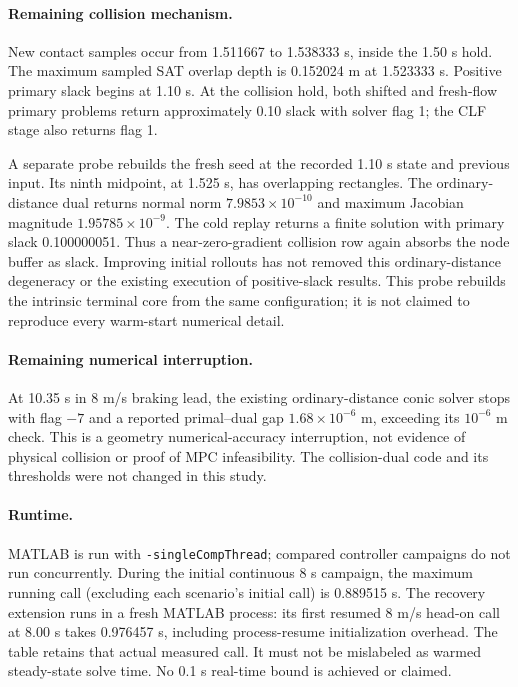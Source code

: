 \documentclass[11pt]{article}
\begin{document}
\paragraph{Remaining collision mechanism.} New contact samples occur from
1.511667 to 1.538333 s, inside the 1.50 s hold. The maximum sampled SAT overlap
depth is 0.152024 m at 1.523333 s. Positive primary slack begins at 1.10 s.
At the collision hold, both shifted and fresh-flow primary problems return
approximately 0.10 slack with solver flag 1; the CLF stage also returns flag 1.

A separate probe rebuilds the fresh seed at the recorded 1.10 s state and
previous input. Its ninth midpoint, at 1.525 s, has overlapping rectangles.
The ordinary-distance dual returns normal norm $7.9853\times10^{-10}$ and
maximum Jacobian magnitude $1.95785\times10^{-9}$. The cold replay returns a
finite solution with primary slack 0.100000051. Thus a near-zero-gradient
collision row again absorbs the node buffer as slack. Improving initial
rollouts has not removed this ordinary-distance degeneracy or the existing
execution of positive-slack results. This probe rebuilds the intrinsic
terminal core from the same configuration; it is not claimed to reproduce
every warm-start numerical detail.

\paragraph{Remaining numerical interruption.} At 10.35 s in 8 m/s braking
lead, the existing ordinary-distance conic solver stops with flag $-7$ and a
reported primal--dual gap $1.68\times10^{-6}$ m, exceeding its $10^{-6}$ m
check. This is a geometry numerical-accuracy interruption, not evidence of
physical collision or proof of MPC infeasibility. The collision-dual code and
its thresholds were not changed in this study.

\paragraph{Runtime.} MATLAB is run with \texttt{-singleCompThread}; compared
controller campaigns do not run concurrently. During the initial continuous
8 s campaign, the maximum running call (excluding each scenario's initial
call) is 0.889515 s. The recovery extension runs in a fresh MATLAB process:
its first resumed 8 m/s head-on call at 8.00 s takes 0.976457 s, including
process-resume initialization overhead. The table retains that actual measured
call. It must not be mislabeled as warmed steady-state solve time. No 0.1 s
real-time bound is achieved or claimed.
\end{document}
